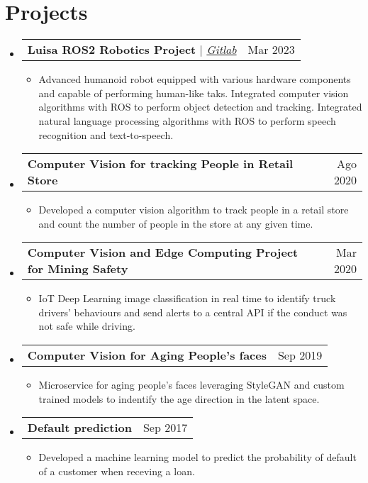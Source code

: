 \documentclass[letterpaper,11pt]{article}
\makeatletter
\newcommand{\resumeItem}[1]{
  \item\small{
    {#1 \vspace{-2pt}}
  }
}
\newcommand{\resumeProjectHeading}[2]{
    \vspace{-2pt}\item
    \begin{tabular*}{0.97\textwidth}{l@{\extracolsep{\fill}}r}
      \small#1 & #2 \\
    \end{tabular*}\vspace{-7pt}
}
\newcommand{\resumeSubHeadingListStart}{\begin{itemize}[leftmargin=0.15in, label={}]}
\newcommand{\resumeSubHeadingListEnd}{\end{itemize}}
\newcommand{\resumeItemListStart}{\begin{itemize}}
\newcommand{\resumeItemListEnd}{\end{itemize}\vspace{-5pt}}
\makeatother
\begin{document}
\section*{Projects}
    \vspace{3pt}
    \resumeSubHeadingListStart
        \resumeProjectHeading
            {\textbf{Luisa ROS2 Robotics Project} $|$ \emph{\href{https://gitlab.com/gaitan.ignacio/luisa-robot}{\color{blue}Gitlab}}}{Mar 2023}
            \resumeItemListStart
                \resumeItem{Advanced humanoid robot equipped with various hardware components and capable of performing human-like taks.
                    Integrated computer vision algorithms with ROS to perform object detection and tracking. 
                    Integrated natural language processing algorithms with ROS to perform speech recognition and text-to-speech.}
            \resumeItemListEnd
        \resumeProjectHeading
            {\textbf{Computer Vision for tracking People in Retail Store}}{Ago 2020}
            \resumeItemListStart
                \resumeItem{Developed a computer vision algorithm to track people in a retail store and count the number of people in the store at any given time.}
            \resumeItemListEnd
        \resumeProjectHeading
            {\textbf{Computer Vision and Edge Computing Project for Mining Safety}}{Mar 2020}
            \resumeItemListStart
                \resumeItem{IoT Deep Learning image classification in real time to identify truck drivers’ behaviours and send alerts to a central API if the conduct was not safe while driving.}
            \resumeItemListEnd
        \resumeProjectHeading
            {\textbf{Computer Vision for Aging People’s faces}}{Sep 2019}
            \resumeItemListStart
                \resumeItem{Microservice for aging people's faces leveraging StyleGAN and custom trained models to indentify the age direction in the latent space.}
            \resumeItemListEnd
        \resumeProjectHeading
            {\textbf{Default prediction}}{Sep 2017}
            \resumeItemListStart
                \resumeItem{Developed a machine learning model to predict the probability of default of a customer when receving a loan.}
            \resumeItemListEnd
    \resumeSubHeadingListEnd
\end{document}
